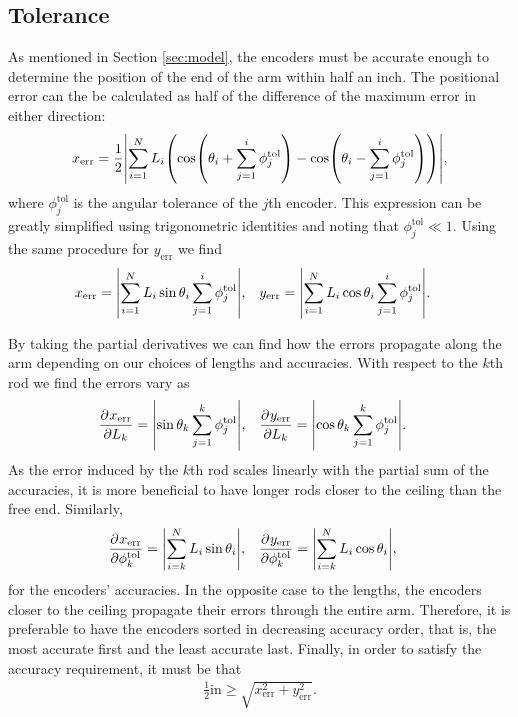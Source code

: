 \documentclass[12pt,a4paper]{article}
\let\originalleft\left
\let\originalright\right
\renewcommand{\left}{\mathopen{}\mathclose\bgroup\originalleft}
\renewcommand{\right}{\aftergroup\egroup\originalright}
\newcommand{\pdiff}[3][]{\frac{\partial^{#1}#2}{\partial{#3}^{#1}}}
\begin{document}
\subsection{Tolerance}
\label{sec:tol}
As mentioned in Section \ref{sec:model}, the encoders must be accurate enough to determine the position of the end of the arm within half an inch. The positional error can the be calculated as half of the difference of the maximum error in either direction:
\begin{align*}
x_\text{err} = \frac{1}{2} \left| \sum_{i=1}^N L_i \left( \cos \left( \theta_i + \sum_{j=1}^i \phi_j^\text{tol} \right) - \cos \left( \theta_i - \sum_{j=1}^i \phi_j^\text{tol} \right) \right) \right|,
\end{align*}
where $\phi_j^\text{tol}$ is the angular tolerance of the $j$th encoder. This expression can be greatly simplified using trigonometric identities and noting that $\phi_j^\text{tol} \ll 1$. Using the same procedure for $y_\text{err}$ we find 
\begin{align}
x_\text{err} &= \left| \sum_{i=1}^N L_i \sin \theta_i \sum_{j=1}^i \phi_j^\text{tol} \right|, & y_\text{err} &= \left| \sum_{i=1}^N L_i \cos \theta_i \sum_{j=1}^i \phi_j^\text{tol} \right|.
\end{align}

By taking the partial derivatives we can find how the errors propagate along the arm depending on our choices of lengths and accuracies. With respect to the $k$th rod we find the errors vary as
\begin{align}
\pdiff{x_\text{err}}{L_k} &= \left| \sin \theta_k \sum_{j=1}^k \phi_j^\text{tol} \right|, & \pdiff{y_\text{err}}{L_k} &= \left| \cos \theta_k \sum_{j=1}^k \phi_j^\text{tol} \right|.
\end{align}
As the error induced by the $k$th rod scales linearly with the partial sum of the accuracies, it is more beneficial to have longer rods closer to the ceiling than the free end. Similarly,
\begin{align}
\pdiff{x_\text{err}}{\phi_k^\text{tol}} &= \left| \sum_{i=k}^N L_i \sin \theta_i \right|, & \pdiff{y_\text{err}}{\phi_k^\text{tol}} &= \left| \sum_{i=k}^N L_i \cos \theta_i \right|,
\end{align}
for the encoders' accuracies. In the opposite case to the lengths, the encoders closer to the ceiling propagate their errors through the entire arm. Therefore, it is preferable to have the encoders sorted in decreasing accuracy order, that is, the most accurate first and the least accurate last. Finally, in order to satisfy the accuracy requirement, it must be that
\begin{align}
\frac{1}{2} \text{in} \geq \sqrt{x_\text{err}^2 + y_\text{err}^2}.
\label{eq:acc}
\end{align}
\end{document}
